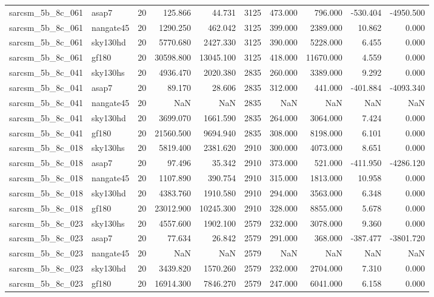 \begin{tabular}{llrrrrrrrr}
sarcsm\_5b\_8c\_061 & asap7 & 20 & 125.866 & 44.731 & 3125 & 473.000 & 796.000 & -530.404 & -4950.500 \\
sarcsm\_5b\_8c\_061 & nangate45 & 20 & 1290.250 & 462.042 & 3125 & 399.000 & 2389.000 & 10.862 & 0.000 \\
sarcsm\_5b\_8c\_061 & sky130hd & 20 & 5770.680 & 2427.330 & 3125 & 390.000 & 5228.000 & 6.455 & 0.000 \\
sarcsm\_5b\_8c\_061 & gf180 & 20 & 30598.800 & 13045.100 & 3125 & 418.000 & 11670.000 & 4.559 & 0.000 \\
sarcsm\_5b\_8c\_041 & sky130hs & 20 & 4936.470 & 2020.380 & 2835 & 260.000 & 3389.000 & 9.292 & 0.000 \\
sarcsm\_5b\_8c\_041 & asap7 & 20 & 89.170 & 28.606 & 2835 & 312.000 & 441.000 & -401.884 & -4093.340 \\
sarcsm\_5b\_8c\_041 & nangate45 & 20 & NaN & NaN & 2835 & NaN & NaN & NaN & NaN \\
sarcsm\_5b\_8c\_041 & sky130hd & 20 & 3699.070 & 1661.590 & 2835 & 264.000 & 3064.000 & 7.424 & 0.000 \\
sarcsm\_5b\_8c\_041 & gf180 & 20 & 21560.500 & 9694.940 & 2835 & 308.000 & 8198.000 & 6.101 & 0.000 \\
sarcsm\_5b\_8c\_018 & sky130hs & 20 & 5819.400 & 2381.620 & 2910 & 300.000 & 4073.000 & 8.651 & 0.000 \\
sarcsm\_5b\_8c\_018 & asap7 & 20 & 97.496 & 35.342 & 2910 & 373.000 & 521.000 & -411.950 & -4286.120 \\
sarcsm\_5b\_8c\_018 & nangate45 & 20 & 1107.890 & 390.754 & 2910 & 315.000 & 1813.000 & 10.958 & 0.000 \\
sarcsm\_5b\_8c\_018 & sky130hd & 20 & 4383.760 & 1910.580 & 2910 & 294.000 & 3563.000 & 6.348 & 0.000 \\
sarcsm\_5b\_8c\_018 & gf180 & 20 & 23012.900 & 10245.300 & 2910 & 328.000 & 8855.000 & 5.678 & 0.000 \\
sarcsm\_5b\_8c\_023 & sky130hs & 20 & 4557.600 & 1902.100 & 2579 & 232.000 & 3078.000 & 9.360 & 0.000 \\
sarcsm\_5b\_8c\_023 & asap7 & 20 & 77.634 & 26.842 & 2579 & 291.000 & 368.000 & -387.477 & -3801.720 \\
sarcsm\_5b\_8c\_023 & nangate45 & 20 & NaN & NaN & 2579 & NaN & NaN & NaN & NaN \\
sarcsm\_5b\_8c\_023 & sky130hd & 20 & 3439.820 & 1570.260 & 2579 & 232.000 & 2704.000 & 7.310 & 0.000 \\
sarcsm\_5b\_8c\_023 & gf180 & 20 & 16914.300 & 7846.270 & 2579 & 247.000 & 6041.000 & 6.158 & 0.000 \\

\end{tabular}
